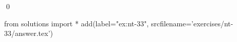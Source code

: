 
\begin{ex} 
  \label{ex:nt-33}
  
  \qed
\end{ex} 
\begin{python0}
from solutions import *
add(label="ex:nt-33",
    srcfilename='exercises/nt-33/answer.tex') 
\end{python0}
